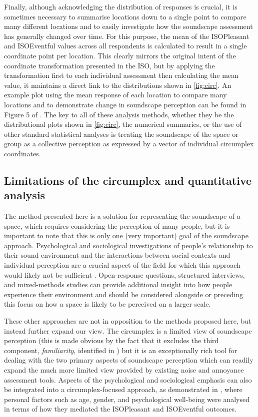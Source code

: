 Finally, although acknowledging the distribution of responses is crucial, it is sometimes necessary to summarise locations down to a single point to compare many different locations and to easily investigate how the soundscape assessment has generally changed over time. For this purpose, the mean of the ISOPleasant and ISOEventful values across all respondents is calculated to result in a single coordinate point per location. This clearly mirrors the original intent of the coordinate transformation presented in the ISO, but by applying the transformation first to each individual assessment then calculating the mean value, it maintains a direct link to the distributions shown in \autoref{fig:circ}. An example plot using the mean response of each location to compare many locations and to demonstrate change in soundscape perception can be found in Figure 5 of \citet{Mitchell2021Investigating}. The key to all of these analysis methods, whether they be the distributional plots shown in \autoref{fig:circ}, the numerical summaries, or the use of other standard statistical analyses is treating the soundscape of the space or group as a collective perception as expressed by a vector of individual circumplex coordinates.

\subsection{Limitations of the circumplex and quantitative analysis}
The method presented here is a solution for representing the soundscape of a space, which requires considering the perception of many people, but it is important to note that this is only one (very important) goal of the soundscape approach. Psychological and sociological investigations of people's relationship to their sound environment and the interactions between social contexts and individual perception are a crucial aspect of the field for which this approach would likely not be sufficient \citep{Bild2018Public}. Open-response questions, structured interviews, and mixed-methods studies can provide additional insight into how people experience their environment and should be considered alongside or preceding this focus on how a space is likely to be perceived on a larger scale.

These other approaches are not in opposition to the methods proposed here, but instead further expand our view. The circumplex is a limited view of soundscape perception (this is made obvious by the fact that it excludes the third component, \emph{familiarity}, identified in \citet{Axelsson2010principal}) but it is an exceptionally rich tool for dealing with the two primary aspects of soundscape perception which can readily expand the much more limited view provided by existing noise and annoyance assessment tools. Aspects of the psychological and sociological emphasis can also be integrated into a circumplex-focused approach, as demonstrated in \citet{Erfanian2021Psychological}, where personal factors such as age, gender, and psychological well-being were analysed in terms of how they mediated the ISOPleasant and ISOEventful outcomes.

